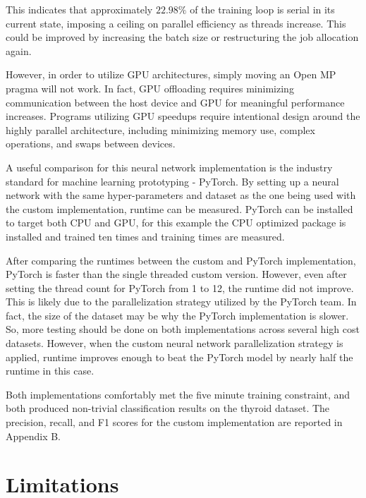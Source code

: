 \documentclass[journal]{IEEEtran}
\begin{document}
This indicates that approximately $22.98\%$ of the training loop is serial in its current state, imposing a ceiling on parallel efficiency as threads increase. This could be improved by increasing the batch size or restructuring the job allocation again.
\par However, in order to utilize GPU architectures, simply moving an Open MP pragma will not work. In fact, GPU offloading requires minimizing communication between the host device and GPU for meaningful performance increases. Programs utilizing GPU speedups require intentional design around the highly parallel architecture, including minimizing memory use, complex operations, and swaps between devices.
\par A useful comparison for this neural network implementation is the industry standard for machine learning prototyping - PyTorch. By setting up a neural network with the same hyper-parameters and dataset as the one being used with the custom implementation, runtime can be measured. PyTorch can be installed to target both CPU and GPU, for this example the CPU optimized package is installed and trained ten times and training times are measured. 
\par After comparing the runtimes between the custom and PyTorch implementation, PyTorch is faster than the single threaded custom version. However, even after setting the thread count for PyTorch from 1 to 12, the runtime did not improve. This is likely due to the parallelization strategy utilized by the PyTorch team. In fact, the size of the dataset may be why the PyTorch implementation is slower. So, more testing should be done on both implementations across several high cost datasets. However, when the custom neural network parallelization strategy is applied, runtime improves enough to beat the PyTorch model by nearly half the runtime in this case.
\par Both implementations comfortably met the five minute training constraint, and both produced non-trivial classification results on the thyroid dataset. The precision, recall, and F1 scores for the custom implementation are reported in Appendix B.

\section{Limitations}
\end{document}
